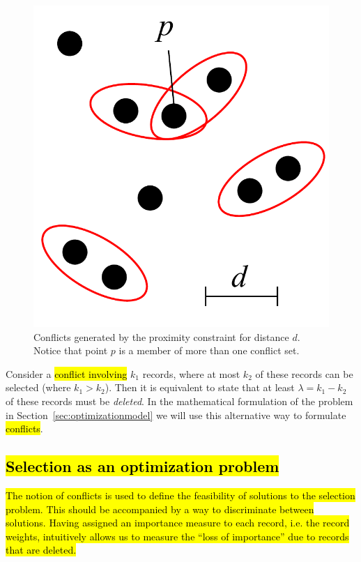 \begin{figure}[htbp]
\begin{center}
\includegraphics[scale=.3]{figs/cvl_proximity_conflicts.pdf}
\caption{Conflicts generated by the proximity constraint for distance $d$. Notice that point $p$ is a member of more than one conflict set.}
\label{fig:proximity:conflict}
\end{center}
\end{figure}

Consider a \hl{conflict involving} $k_1$ records, where at most $k_2$ of these records can be selected (where $k_1 > k_2$). Then it is equivalent to state that at least $\lambda = k_1 - k_2$ of these records must be \emph{deleted}. In the mathematical formulation of the problem in Section~\ref{sec:optimizationmodel} we will use this alternative way to formulate \hl{conflicts}.

\subsection{\hl{Selection as an optimization problem}}
\label{sec:filtering}
\hl{The notion of conflicts is used to define the feasibility of solutions to the selection problem. This should be accompanied by a way to discriminate between solutions. Having assigned an importance measure to each record, i.e. the record weights, intuitively allows us to measure the ``loss of importance'' due to records that are deleted.} 

